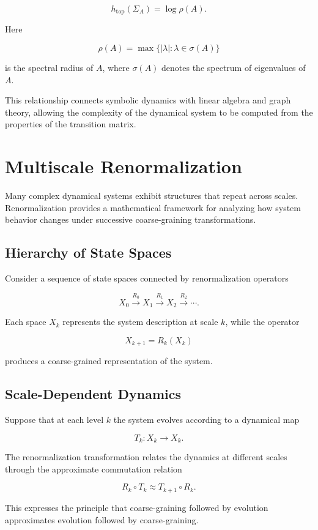 \documentclass[12pt]{article}
\begin{document}
\[
h_{\mathrm{top}}(\Sigma_A)=\log \rho(A).
\]

Here

\[
\rho(A)=\max\{|\lambda|:\lambda\in\sigma(A)\}
\]

is the spectral radius of $A$, where $\sigma(A)$ denotes the spectrum of eigenvalues of $A$.

This relationship connects symbolic dynamics with linear algebra and graph theory, allowing the complexity of the dynamical system to be computed from the properties of the transition matrix.

\section{Multiscale Renormalization}

Many complex dynamical systems exhibit structures that repeat across scales. Renormalization provides a mathematical framework for analyzing how system behavior changes under successive coarse-graining transformations.

\subsection{Hierarchy of State Spaces}

Consider a sequence of state spaces connected by renormalization operators

\[
X_0 \xrightarrow{R_0} X_1 \xrightarrow{R_1} X_2 \xrightarrow{R_2} \cdots .
\]

Each space $X_k$ represents the system description at scale $k$, while the operator

\[
X_{k+1}=R_k(X_k)
\]

produces a coarse-grained representation of the system.

\subsection{Scale-Dependent Dynamics}

Suppose that at each level $k$ the system evolves according to a dynamical map

\[
T_k : X_k \rightarrow X_k .
\]

The renormalization transformation relates the dynamics at different scales through the approximate commutation relation

\[
R_k \circ T_k \approx T_{k+1} \circ R_k .
\]

This expresses the principle that coarse-graining followed by evolution approximates evolution followed by coarse-graining.
\end{document}
